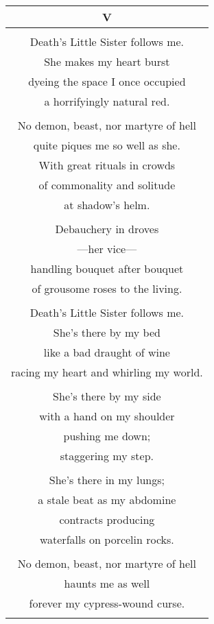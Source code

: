\documentclass{article}
\begin{document}
\begin{center}
\begin{tabular}{c}
\textbf{V} \\ \hline
\\
Death's Little Sister follows me. \\
She makes my heart burst \\
dyeing the space I once occupied \\
a horrifyingly natural red. \\
\\
No demon, beast, nor martyre of hell \\
quite piques me so well as she. \\
With great rituals in crowds \\
of commonality and solitude \\
at shadow's helm. \\
\\
Debauchery in droves \\
---her vice--- \\
handling bouquet after bouquet \\
of grousome roses to the living. \\
\\
Death's Little Sister follows me. \\
She's there by my bed \\
like a bad draught of wine \\
racing my heart and whirling my world. \\
\\
She's there by my side \\
with a hand on my shoulder \\
pushing me down; \\
staggering my step. \\
\\
She's there in my lungs; \\
a stale beat as my abdomine \\
contracts producing \\
waterfalls on porcelin rocks. \\
\\
No demon, beast, nor martyre of hell \\
haunts me as well \\
forever my cypress-wound curse. \\
\\
\end{tabular}
\end{center}
\end{document}
